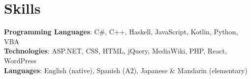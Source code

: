 \section{Skills}
\begin{itemize}[leftmargin=0.15in, label={}]
\small{\item{
    \textbf{Programming Languages}{: C\#, C++, Haskell, JavaScript, Kotlin, Python, VBA} \\
    \textbf{Technologies}{: ASP.NET, CSS, HTML, jQuery, MediaWiki, PHP, React, WordPress} \\
    \textbf{Languages}{: English (native), Spanish (A2), Japanese \& Mandarin (elementary)} \\
}}
\end{itemize}